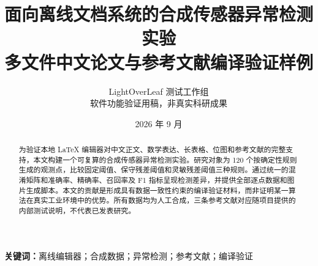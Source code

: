 \documentclass[UTF8,a4paper,12pt]{ctexart}
\title{面向离线文档系统的合成传感器异常检测实验\\\large 多文件中文论文与参考文献编译验证样例}
\author{LightOverLeaf 测试工作组\\\small 软件功能验证用稿，非真实科研成果}
\date{2026 年 9 月}
\begin{document}
\maketitle
\begin{abstract}
为验证本地 LaTeX 编辑器对中文正文、数学表达、长表格、位图和参考文献的完整支持，本文构建一个可复算的合成传感器异常检测实验。研究对象为 120 个按确定性规则生成的观测点，比较固定阈值、保守残差阈值和灵敏残差阈值三种规则。通过统一的混淆矩阵和准确率、精确率、召回率及 F1 指标呈现检测差异，并提供全部逐点数据和图片生成脚本。本文的贡献是形成具有数据一致性约束的编译验证材料，而非证明某一算法在真实工业环境中的优势。所有数据均为人工合成，三条参考文献对应随项目提供的内部测试说明，不代表已发表研究。
\end{abstract}
\noindent\textbf{关键词：}离线编辑器；合成数据；异常检测；参考文献；编译验证
\clearpage
\tableofcontents
\clearpage




\clearpage


\clearpage
\appendix

\end{document}
